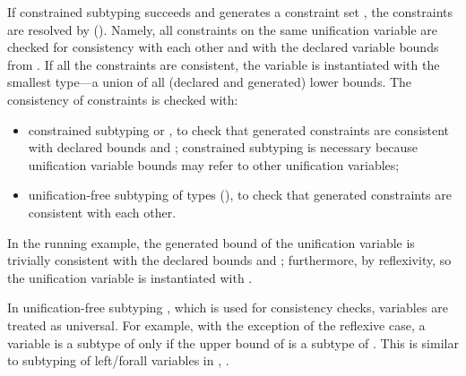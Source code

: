 If constrained subtyping succeeds and generates a constraint set
\CSet, the constraints are resolved %
by \solvectrdflt ().
Namely, all constraints on the same unification variable are checked for
consistency with each other and with the declared variable bounds from
\UEnv. If all the constraints are consistent, the variable is instantiated
with the smallest type---a union of all (declared and generated) lower bounds.
The consistency of constraints is checked with:
\begin{itemize}
    \item constrained subtyping \subtyctrLdflt{\tylb}{\ty} or
        \subtyctrRdflt{\ty}{\tyub}, to check that generated constraints \ty
        are consistent with declared bounds \tylb and \tyub;
        constrained subtyping is necessary because unification variable
        bounds may refer to other unification variables;
    \item unification-free subtyping of types \subtydflt{\tylb}{\tyub}
        (),
        to check that generated constraints are consistent with each other.
\end{itemize}
In the running example, the generated bound \vx of the unification variable \va
is trivially consistent with the declared bounds \tybot and \tyany;
furthermore, \subty{\vx{\symsub}\tyint}{\vx}{\vx} by reflexivity,
so the unification variable \va is instantiated with \vx.

In unification-free subtyping , 
which is used for consistency checks,
variables are treated as universal. For example, with the exception of
the reflexive case, a variable \vany is a subtype of \ty only if the upper bound
\tyub of \vany is a subtype of \ty. This is similar to subtyping of
left/forall variables in , .


